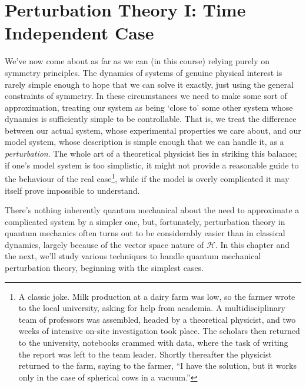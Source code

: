 \documentclass{article}
\theoremstyle{plain}\theoremheaderfont{\normalfont\itshape}\theorembodyfont{\rmfamily}\theoremseparator{.}\newtheorem*{rem}{Remark}\newtheorem*{ex}{Example}\newtheorem*{proof}{Proof}\newtheorem*{altp}{Alternative proof}
\theoremstyle{plain}\theoremheaderfont{\normalfont\bfseries}\theorembodyfont{\rmfamily}\theoremseparator{.}\newtheorem{thm}{Theorem}[section]\newtheorem{lem}[thm]{Lemma}\newtheorem{prop}[thm]{Proposition}\newtheorem*{cor}{Corollary}\newtheorem{defn}[thm]{Definition}\newtheorem{clm}[thm]{Claim}\newtheorem{clminproof}{Claim}
\theoremstyle{break}\theoremheaderfont{\normalfont\itshape}\theorembodyfont{\rmfamily}\theoremseparator{.\medskip}\newtheorem*{proofskip}{Proof}\newtheorem*{exs}{Examples}\newtheorem*{rems}{Remarks}
\theoremstyle{break}\theoremheaderfont{\normalfont\bfseries}\theorembodyfont{\rmfamily}\theoremseparator{.\medskip}\newtheorem{lemskip}[thm]{Lemma}\newtheorem{defnskip}[thm]{Definition}\newtheorem{propskip}[thm]{Proposition}\newtheorem{thmskip}[thm]{Theorem}
\numberwithin{equation}{section}
\newcommand{\hb}{\mathcal{H}}
\begin{document}
    \section{Perturbation Theory I: Time Independent Case}\label{Chap:Time_Independent_Perturbation}
    We've now come about as far as we can (in this course) relying purely on symmetry principles. The dynamics of systems of genuine physical interest is rarely simple enough to hope that we can solve it exactly, just using the general constraints of symmetry. In these circumstances we need to make some sort of approximation, treating our system as being `close to' some other system whose dynamics is sufficiently simple to be controllable. That is, we treat the difference between our actual system, whose experimental properties we care about, and our model system, whose description is simple enough that we can handle it, as a \textit{perturbation}. The whole art of a theoretical physicist lies in striking this balance; if one's model system is too simplistic, it might not provide a reasonable guide to the behaviour of the real case\footnote{A classic joke. Milk production at a dairy farm was low, so the farmer wrote to the local university, asking for help from academia. A multidisciplinary team of professors was assembled, headed by a theoretical physicist, and two weeks of intensive on-site investigation took place. The scholars then returned to the university, notebooks crammed with data, where the task of writing the report was left to the team leader. Shortly thereafter the physicist returned to the farm, saying to the farmer, ``I have the solution, but it works only in the case of spherical cows in a vacuum.''}, while if the model is overly complicated it may itself prove impossible to understand.

    There's nothing inherently quantum mechanical about the need to approximate a complicated system by a simpler one, but, fortunately, perturbation theory in quantum mechanics often turns out to be considerably easier than in classical dynamics, largely because of the vector space nature of \(\hb\). In this chapter and the next, we'll study various techniques to handle quantum mechanical perturbation theory, beginning with the simplest cases.
\end{document}
